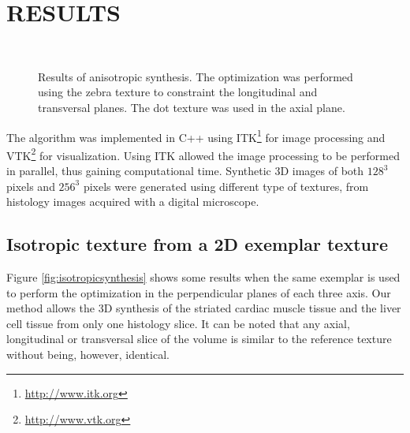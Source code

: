 
\section{\uppercase{Results}}
\label{sec:Results}

\begin{figure}
 \vspace{-0.2cm}
 \centering 
 \\
 \caption{Results of anisotropic synthesis. The optimization was performed using the zebra texture to constraint the longitudinal and transversal planes. The dot texture was used in the axial plane.}
 \label{fig:3DAnisotropicTexture}
 \vspace{-0.1cm}
\end{figure}

The algorithm was implemented in C++ using ITK\footnote{\url{http://www.itk.org}} for image processing and 
VTK\footnote{\url{http://www.vtk.org}} for visualization. 
Using ITK allowed the image processing to be performed in parallel, thus gaining computational time.
Synthetic 3D images of both $128^3$ pixels and $256^3$ pixels were generated using different type of textures, from histology images 
acquired with a digital microscope.%

\subsection{Isotropic texture from a 2D exemplar texture}

Figure \ref{fig:isotropicsynthesis} shows some results when the same exemplar is used
to perform the optimization in the perpendicular planes of each three axis. Our method allows the 3D synthesis of the striated 
cardiac muscle tissue and the liver cell tissue from only one histology slice. 
It can be noted that any axial, longitudinal or transversal slice of the volume is similar to the reference texture without being, however, identical.

